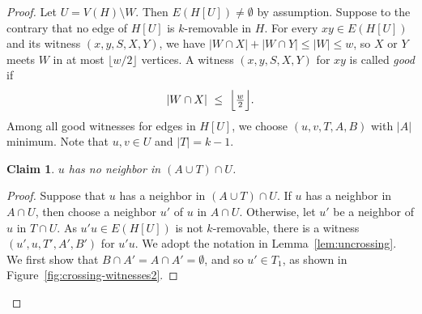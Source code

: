 \documentclass[11pt]{article}
\numberwithin{equation}{section}
\newtheorem{claim}[theorem]{Claim}
\begin{document}
\begin{proof}
Let $U=V(H)\setminus W$. Then $E(H[U])\neq\emptyset$ by assumption.
Suppose to the contrary that no edge of $H[U]$ is
$k$-removable in $H$. 
For every $xy\in E(H[U])$ and its witness $(x,y,S,X,Y)$, we have
$|W\cap X|+|W\cap Y|\le|W|\le w$, so $X$ or $Y$ meets $W$ in at most
$\lfloor w/2\rfloor$ vertices.  
A witness $(x,y,S,X,Y)$ for $xy$ is called {\em good} if \[   |W\cap X|\ \le\ \Bigl\lfloor\tfrac w2\Bigr\rfloor.\]
Among all good witnesses for edges in $H[U]$, we choose $(u,v,T,A,B)$ with $|A|$ minimum. Note that $u,v\in U$ and $|T|=k-1$. 
\begin{claim}\label{clm:no_neighbor_ATU}
$u$ has no neighbor in $(A\cup T)\cap U$.
\end{claim}
\begin{proof} Suppose that $u$ has a neighbor in $(A\cup T) \cap U$.
If $u$ has a neighbor in $A\cap U$, then choose a neighbor $u'$ of $u$ in $A\cap U$.
Otherwise, let $u'$ be a neighbor of $u$ in $T\cap U$.
As $u'u\in E(H[U])$ is not $k$-removable, there is a witness $(u',u,T',A',B')$ for $u'u$. 
We adopt the notation in Lemma~\ref{lem:uncrossing}.
We first show that $B\cap A'=A\cap A'=\emptyset$, and so $u'\in T_1$, as shown in  Figure~\ref{fig:crossing-witnesses2}.  

 


\end{proof}
\end{proof}
\end{document}
